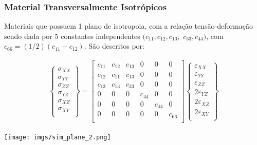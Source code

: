 \documentclass{article}
\begin{document}
\subsubsection*{Material Transversalmente Isotrópicos}
Materiais que possuem 1 plano de isotropoia, com a relação tensão-deformação sendo dada por $5$ constantes independentes $(c_{11}, c_{12}, c_{13},  $ $ c_{33}, c_{44})$, com $c_{66} = (1/2)(c_{11} - c_{12})$. São descritos por:

\begin{minipage}{.5\textwidth}
    \begin{align*}
        \begin{Bmatrix}
            \sigma_{XX} \\
            \sigma_{YY} \\
            \sigma_{ZZ} \\
            \sigma_{YZ} \\
            \sigma_{XZ} \\
            \sigma_{XY} \\
        \end{Bmatrix} =
        \begin{bmatrix}
            c_{11} & c_{12} & c_{13} & 0      & 0      & 0      \\
            c_{12} & c_{11} & c_{13} & 0      & 0      & 0      \\
            c_{13} & c_{13} & c_{33} & 0      & 0      & 0      \\
            0      & 0      & 0      & c_{44} & 0      & 0      \\
            0      & 0      & 0      & 0      & c_{44} & 0      \\
            0      & 0      & 0      & 0      & 0      & c_{66} \\
        \end{bmatrix}
        \begin{Bmatrix}
            \varepsilon_{XX}  \\
            \varepsilon_{YY}  \\
            \varepsilon_{ZZ}  \\
            2\varepsilon_{YZ} \\
            2\varepsilon_{XZ} \\
            2\varepsilon_{XY} \\
        \end{Bmatrix}
    \end{align*}
\end{minipage}
\begin{minipage}{.5\textwidth}
    \centering
    \texttt{[image: imgs/sim\_plane\_2.png]}
\end{minipage}
\end{document}
